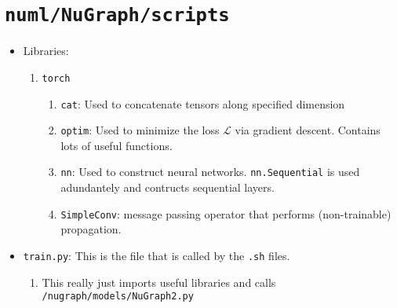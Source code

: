 \section{\texttt{numl/NuGraph/scripts}}


    
\begin{itemize}
    \item Libraries:
        \begin{enumerate}
            \item \texttt{torch}
                \begin{enumerate}
                    \item \texttt{cat}: Used to concatenate tensors along specified dimension
                    \item \texttt{optim}: Used to minimize the loss $\mathcal{L}$ via gradient descent. Contains lots of useful functions.
                    \item \texttt{nn}: Used to construct neural networks. \texttt{nn.Sequential} is used adundantely and contructs sequential layers.

                    \item \texttt{SimpleConv}: message passing operator that performs (non-trainable) propagation.
                \end{enumerate}
        \end{enumerate}


    \item \texttt{train.py}: This is the file that is called by the \texttt{.sh} files.
        \begin{enumerate}
            \item This really just imports useful libraries and calls \texttt{/nugraph/models/NuGraph2.py}
        \end{enumerate}


\end{itemize}
